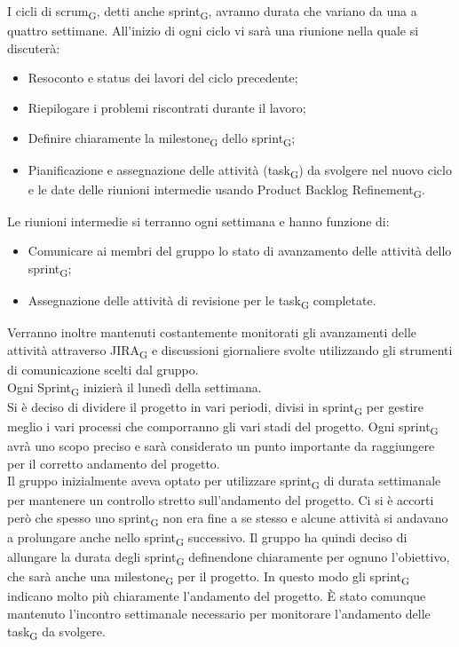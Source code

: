 	I cicli di scrum\textsubscript{G}, detti anche sprint\textsubscript{G}, avranno durata che variano da una a quattro settimane. All'inizio di ogni ciclo vi sarà una riunione nella quale si discuterà:
	\begin{itemize}
		\item Resoconto e status dei lavori del ciclo precedente;
		\item Riepilogare i problemi riscontrati durante il lavoro;
		\item Definire chiaramente la milestone\textsubscript{G} dello sprint\textsubscript{G};
		\item Pianificazione e assegnazione delle attività (task\textsubscript{G}) da svolgere nel nuovo ciclo e le date delle riunioni intermedie usando Product Backlog Refinement\textsubscript{G}.
	\end{itemize}
	Le riunioni intermedie si terranno ogni settimana e hanno funzione di:
	\begin{itemize}
		\item Comunicare ai membri del gruppo lo stato di avanzamento delle attività dello sprint\textsubscript{G};
		\item Assegnazione delle attività di revisione per le task\textsubscript{G} completate.
	\end{itemize}
	Verranno inoltre mantenuti costantemente monitorati gli avanzamenti delle attività attraverso JIRA\textsubscript{G} e discussioni giornaliere svolte utilizzando gli strumenti di comunicazione scelti dal gruppo.\\
	Ogni Sprint\textsubscript{G} inizierà il lunedì della settimana.\\
	Si è deciso di dividere il progetto in vari periodi, divisi in sprint\textsubscript{G} per gestire meglio i vari processi che comporranno gli vari stadi del progetto. Ogni sprint\textsubscript{G} avrà uno scopo preciso e sarà considerato un punto importante da raggiungere per il corretto andamento del progetto.\\
	Il gruppo inizialmente aveva optato per utilizzare sprint\textsubscript{G} di durata settimanale per mantenere un controllo stretto sull'andamento del progetto. Ci si è accorti però che spesso uno sprint\textsubscript{G} non era fine a se stesso e alcune attività si andavano a prolungare anche nello sprint\textsubscript{G} successivo. Il gruppo ha quindi deciso di allungare la durata degli sprint\textsubscript{G}  definendone chiaramente per ognuno l'obiettivo, che sarà anche una milestone\textsubscript{G} per il progetto. In questo modo gli sprint\textsubscript{G} indicano molto più chiaramente l'andamento del progetto. È stato comunque mantenuto l'incontro settimanale necessario per monitorare l'andamento delle task\textsubscript{G} da svolgere.
